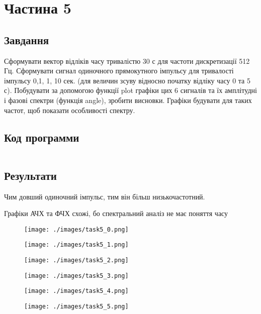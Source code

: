 \section{Частина 5}
\label{sec:task5}

\subsection{Завдання}
\label{subsec:task5_task}

Сформувати вектор відліків часу тривалістю 30 с для частоти
дискретизації 512 Гц. Сформувати сигнал одиночного прямокутного імпульсу
для тривалості імпульсу 0,1, 1, 10 сек. (для величин зсуву відносно початку
відліку часу 0 та 5 с). Побудувати за допомогою функції plot графіки цих 6
сигналів та їх амплітудні і фазові спектри (функція angle),
зробити висновки. Графіки будувати для таких частот, щоб показати
особливості спектру.

\subsection{Код программи}
\label{subsec:task5_code}
\inputminted{python}{../src/task5.py}

\subsection{Результати}
\label{subsec:task5_results}

Чим довший одиночний імпульс,
тим він більш низькочастотний.

Графіки АЧХ та ФЧХ схожі,
бо спектральний аналіз не має поняття часу

\begin{figure}[!ht]
    \centering
    \texttt{[image: ./images/task5\_0.png]}
\end{figure}

\begin{figure}[!ht]
    \centering
    \texttt{[image: ./images/task5\_1.png]}
\end{figure}

\begin{figure}[!ht]
    \centering
    \texttt{[image: ./images/task5\_2.png]}
\end{figure}

\begin{figure}[!ht]
    \centering
    \texttt{[image: ./images/task5\_3.png]}
\end{figure}

\begin{figure}[!ht]
    \centering
    \texttt{[image: ./images/task5\_4.png]}
\end{figure}

\begin{figure}[!ht]
    \centering
    \texttt{[image: ./images/task5\_5.png]}
\end{figure}

